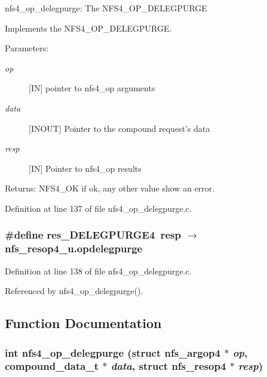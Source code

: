 nfs4\_\-op\_\-delegpurge: The NFS4\_\-OP\_\-DELEGPURGE

Implements the NFS4\_\-OP\_\-DELEGPURGE.

\begin{Desc}
\item[Parameters:]
\begin{description}
\item[{\em op}][IN] pointer to nfs4\_\-op arguments \item[{\em data}][INOUT] Pointer to the compound request's data \item[{\em resp}][IN] Pointer to nfs4\_\-op results\end{description}
\end{Desc}
\begin{Desc}
\item[Returns:]NFS4\_\-OK if ok, any other value show an error. \end{Desc}


Definition at line 137 of file nfs4\_\-op\_\-delegpurge.c.
\subsubsection{\setlength{\rightskip}{0pt plus 5cm}\#define res\_\-DELEGPURGE4\ resp $\rightarrow$ nfs\_\-resop4\_\-u.opdelegpurge}\label{nfs4__op__delegpurge_8c_a1}




Definition at line 138 of file nfs4\_\-op\_\-delegpurge.c.

Referenced by nfs4\_\-op\_\-delegpurge().

\subsection{Function Documentation}
\subsubsection{\setlength{\rightskip}{0pt plus 5cm}int nfs4\_\-op\_\-delegpurge (struct nfs\_\-argop4 $\ast$ {\em op}, compound\_\-data\_\-t $\ast$ {\em data}, struct nfs\_\-resop4 $\ast$ {\em resp})}\label{nfs4__op__delegpurge_8c_a2}




